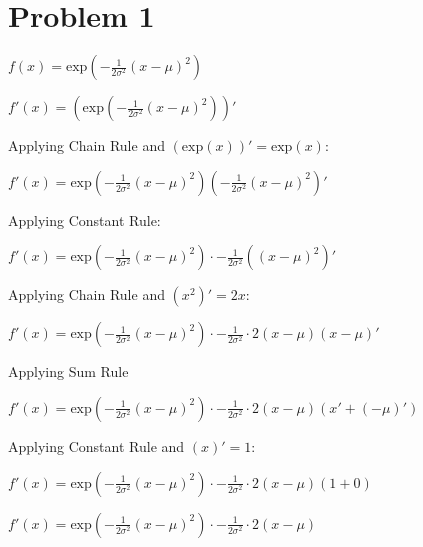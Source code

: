\section*{Problem 1}

\singlespacing

$f(x) = \text{exp}(-\frac{1}{2\sigma^2}(x - \mu)^2)$

\singlespacing

$f'(x) = (\text{exp}(-\frac{1}{2\sigma^2}(x - \mu)^2))'$

\singlespacing
Applying Chain Rule and $(\text{exp}(x))' = \text{exp}(x)$:
\singlespacing

$f'(x) = \text{exp}(-\frac{1}{2\sigma^2}(x - \mu)^2) (-\frac{1}{2\sigma^2}(x - \mu)^2)'$

\singlespacing

Applying Constant Rule:

\singlespacing

$f'(x) = \text{exp}(-\frac{1}{2\sigma^2}(x - \mu)^2) \cdot -\frac{1}{2\sigma^2}((x - \mu)^2)'$

\singlespacing
Applying Chain Rule and $(x^2)' = 2x$:
\singlespacing

$f'(x) = \text{exp}(-\frac{1}{2\sigma^2}(x - \mu)^2) \cdot -\frac{1}{2\sigma^2}\cdot2(x - \mu) (x - \mu)'$

\singlespacing

Applying Sum Rule

\singlespacing

$f'(x) = \text{exp}(-\frac{1}{2\sigma^2}(x - \mu)^2) \cdot -\frac{1}{2\sigma^2}\cdot2(x - \mu) (x' + (- \mu)')$

\singlespacing

Applying Constant Rule and $(x)' = 1$:

\singlespacing

$f'(x) = \text{exp}(-\frac{1}{2\sigma^2}(x - \mu)^2) \cdot -\frac{1}{2\sigma^2}\cdot2(x - \mu) (1 + 0)$

\singlespacing

$f'(x) = \text{exp}(-\frac{1}{2\sigma^2}(x - \mu)^2) \cdot -\frac{1}{2\sigma^2}\cdot2(x - \mu)$